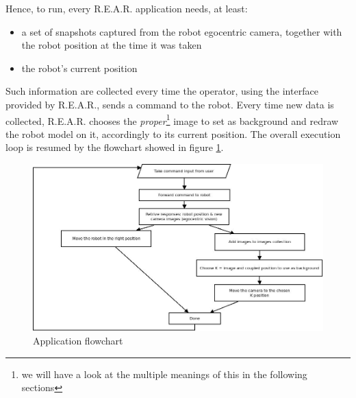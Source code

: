 %
Hence, to run, every \textsf{R.E.A.R.} application needs, at least:
%
\begin{itemize}
  \item a set of snapshots captured from the robot egocentric camera, 
    together with the robot position at the time it was taken
  \item the robot's current position
\end{itemize}
%
Such information are collected every time the operator, using the 
interface provided by \textsf{R.E.A.R.}, sends a command to the robot.
%
Every time new data is collected, \textsf{R.E.A.R.} chooses the 
\textit{proper}\footnote{we will have a look at the multiple meanings 
of this in the following sections} image to set as background 
and redraw the robot model on it, accordingly to its current position.
%
The overall execution loop is resumed by the flowchart showed 
in figure \ref{fig:overall_diagram}.
%
\begin{figure}[!h]
  \begin{center}
    \includegraphics[width=350pt]{img/overall_diagram.jpeg}  %
    \caption{Application flowchart}
    \label{fig:overall_diagram}
  \end{center}
\end{figure}
%
%

%

